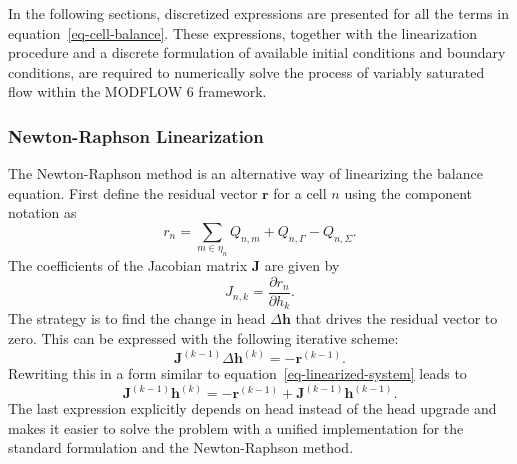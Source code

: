 \documentclass[fleqn]{article}
\begin{document}
In the following sections, discretized expressions are presented for
all the terms in equation~\ref{eq-cell-balance}. These expressions,
together with the linearization procedure and a discrete
formulation of available initial conditions and boundary conditions, 
are required to numerically solve the process of variably saturated 
flow within the MODFLOW 6 framework.

\subsubsection*{Newton-Raphson Linearization}
The Newton-Raphson method is an alternative way of linearizing the
balance equation. First define the residual vector $\mathbf{r}$
for a cell $n$ using the component notation as
\begin{equation}
  r_n = \sum_{m \in \eta_n} Q_{n,m} + 
        Q_{n, \Gamma} - 
        Q_{n,\Sigma}.
  \label{eq-residual-cell}
\end{equation}
The coefficients of the Jacobian matrix $\mathbf{J}$ are given by
\begin{equation}
  J_{n,k} = \frac{\partial r_n}{\partial h_k}.
  \label{eq-jacobian}
\end{equation}
The strategy is to find the change in head $\Delta\mathbf{h}$ that
drives the residual vector to zero. This can be expressed with the
following iterative scheme:
\begin{equation}
  \mathbf{J}^{(k-1)} \Delta \mathbf{h}^{(k)} = -\mathbf{r}^{(k-1)}.
\end{equation}
Rewriting this in a form similar to equation~\ref{eq-linearized-system}
leads to
\begin{equation}
  \mathbf{J}^{(k-1)} \mathbf{h}^{(k)} = 
  -\mathbf{r}^{(k-1)} + \mathbf{J}^{(k-1)} \mathbf{h}^{(k-1)}.
  \label{eq-newton-head}
\end{equation}
The last expression explicitly depends on head instead of the
head upgrade and makes it easier to solve the problem with a
unified implementation for the standard formulation and the
Newton-Raphson method.
\end{document}
